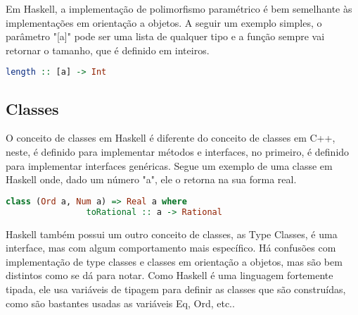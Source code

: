 \documentclass{article}
\begin{document}
        Em Haskell, a implementação de polimorfismo paramétrico é bem semelhante às implementações em orientação a objetos. A seguir um exemplo simples, o parâmetro "[a]" pode ser uma lista de qualquer tipo e a função sempre vai retornar o tamanho, que é definido em inteiros. 
        \begin{lstlisting}[language=Haskell, frame=single]
            length :: [a] -> Int
        \end{lstlisting}
        
    \subsection*{Classes}
        O conceito de classes em Haskell é diferente do conceito de classes em C++, neste, é definido para implementar métodos e interfaces, no primeiro, é definido para implementar interfaces genéricas. Segue um exemplo de uma classe em Haskell onde, dado um número "a", ele o retorna na sua forma real.
        \begin{lstlisting}[language=Haskell, frame=single]
            class (Ord a, Num a) => Real a where
                toRational :: a -> Rational
        \end{lstlisting}
        
        Haskell também possui um outro conceito de classes, as Type Classes, é uma interface, mas com algum comportamento mais específico. Há confusões com implementação de type classes e classes em orientação a objetos, mas são bem distintos como se dá para notar. Como Haskell é uma linguagem fortemente tipada, ele usa variáveis de tipagem para definir as classes que são construídas, como são bastantes usadas as variáveis Eq, Ord, etc..
\end{document}

